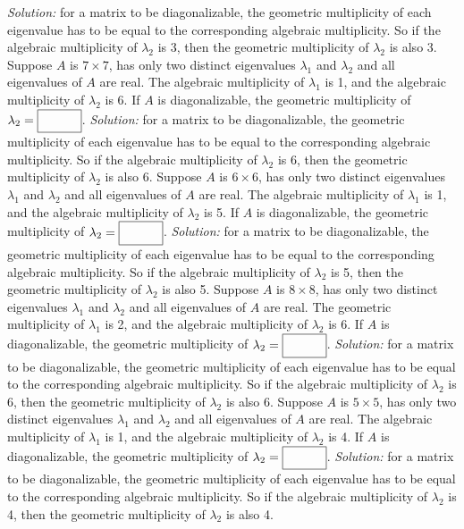 \begin{parts}
        \ifnum {} {\color{DarkBlue} \textit{Solution:} for a matrix to be diagonalizable, the geometric multiplicity of each eigenvalue has to be equal to the corresponding algebraic multiplicity. So if the algebraic multiplicity of $\lambda_2$ is 3, then the geometric multiplicity of $\lambda_2$ is also 3. } \fi      
    \fi 
    \ifnum {}
        Suppose $A$ is $7\times7$, has only two distinct eigenvalues $\lambda_1$ and $\lambda_2$ and all eigenvalues of $A$ are real. The algebraic multiplicity of $\lambda_1$ is 1, and the algebraic multiplicity of $\lambda_2$ is 6. If $A$ is diagonalizable, the geometric multiplicity of $\lambda_2 = \framebox{\strut\hspace{1cm}}$. 
        \ifnum {} {\color{DarkBlue} \textit{Solution:} for a matrix to be diagonalizable, the geometric multiplicity of each eigenvalue has to be equal to the corresponding algebraic multiplicity. So if the algebraic multiplicity of $\lambda_2$ is 6, then the geometric multiplicity of $\lambda_2$ is also 6. } \fi     
    \fi 
    \ifnum {}
        Suppose $A$ is $6\times6$, has only two distinct eigenvalues $\lambda_1$ and $\lambda_2$ and all eigenvalues of $A$ are real. The algebraic multiplicity of $\lambda_1$ is 1, and the algebraic multiplicity of $\lambda_2$ is 5. If $A$ is diagonalizable, the geometric multiplicity of $\lambda_2 = \framebox{\strut\hspace{1cm}}$. 
        \ifnum {} {\color{DarkBlue} \textit{Solution:} for a matrix to be diagonalizable, the geometric multiplicity of each eigenvalue has to be equal to the corresponding algebraic multiplicity. So if the algebraic multiplicity of $\lambda_2$ is 5, then the geometric multiplicity of $\lambda_2$ is also 5. } \fi
    \fi    
    \ifnum {}
        Suppose $A$ is $8\times8$, has only two distinct eigenvalues $\lambda_1$ and $\lambda_2$ and all eigenvalues of $A$ are real. The geometric multiplicity of $\lambda_1$ is 2, and the algebraic multiplicity of $\lambda_2$ is 6. If $A$ is diagonalizable, the geometric multiplicity of $\lambda_2 = \framebox{\strut\hspace{1cm}}$. 
        \ifnum {} {\color{DarkBlue} \textit{Solution:} for a matrix to be diagonalizable, the geometric multiplicity of each eigenvalue has to be equal to the corresponding algebraic multiplicity. So if the algebraic multiplicity of $\lambda_2$ is 6, then the geometric multiplicity of $\lambda_2$ is also 6. } \fi
    \fi    
    \ifnum {}
        Suppose $A$ is $5\times5$, has only two distinct eigenvalues $\lambda_1$ and $\lambda_2$ and all eigenvalues of $A$ are real. The algebraic multiplicity of $\lambda_1$ is 1, and the algebraic multiplicity of $\lambda_2$ is 4. If $A$ is diagonalizable, the geometric multiplicity of $\lambda_2 = \framebox{\strut\hspace{1cm}}$. 
        \ifnum {} {\color{DarkBlue} \textit{Solution:} for a matrix to be diagonalizable, the geometric multiplicity of each eigenvalue has to be equal to the corresponding algebraic multiplicity. So if the algebraic multiplicity of $\lambda_2$ is 4, then the geometric multiplicity of $\lambda_2$ is also 4. } \fi
    \fi      




\end{parts}
